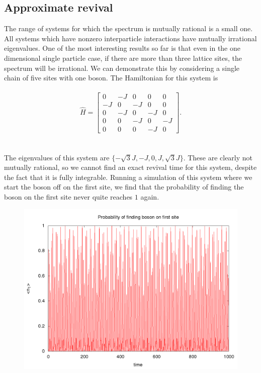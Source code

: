 \documentclass[a4paper,10pt]{article}
\begin{document}
\subsection{Approximate revival}
The range of systems for which the spectrum  is mutually rational is a small one. 
All systems which have nonzero interparticle interactions have mutually irrational eigenvalues. One of the most interesting results so far is that even in the one dimensional single particle case,
if there are more than three lattice sites, the spectrum will be irrational. We can demonstrate this by considering a single chain of five sites with one boson. The Hamiltonian for this 
system is \\\\
\begin{equation}
\hat{H}= \begin{bmatrix}
 0 & -J & 0 & 0 & 0\\
 -J & 0 & -J & 0 & 0\\
 0 & -J & 0 & -J & 0\\
 0 & 0 & -J & 0 & -J\\
 0 & 0 & 0 & -J & 0
 \end{bmatrix}.
\end{equation}
\\\\
The eigenvalues of this system are $\{-\sqrt{3}J,-J,0,J,\sqrt{3}J\}$. These are clearly not mutually rational, so we cannot find an exact revival time for this system, despite the fact that it is 
fully integrable. Running a simulation of this system where we start the boson off on the first site, we find that the probability of finding the boson on the first site never quite reaches $1$ again.

\begin{figure}[H]
 \includegraphics[width=1.0\textwidth]{5_by_1_T1e4_U0}
 \centering
\end{figure}
\end{document}
